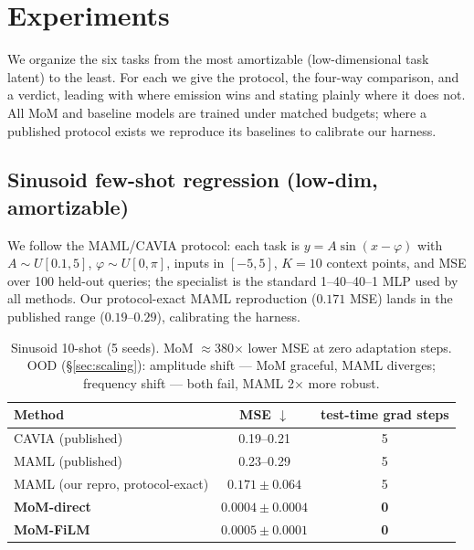 \documentclass[11pt]{article}
\begin{document}
\section{Experiments}\label{sec:exp}

We organize the six tasks from the most amortizable (low-dimensional task latent) to
the least. For each we give the protocol, the four-way comparison, and a verdict,
leading with where emission wins and stating plainly where it does not. All MoM and
baseline models are trained under matched budgets; where a published protocol exists
we reproduce its baselines to calibrate our harness.

\subsection{Sinusoid few-shot regression (low-dim, amortizable)}
We follow the MAML/CAVIA protocol: each task is $y=A\sin(x-\varphi)$ with
$A\sim U[0.1,5]$, $\varphi\sim U[0,\pi]$, inputs in $[-5,5]$, $K{=}10$ context points,
and MSE over 100 held-out queries; the specialist is the standard 1--40--40--1 MLP
used by all methods. Our protocol-exact MAML reproduction ($0.171$ MSE) lands in the
published range ($0.19$--$0.29$), calibrating the harness.
\begin{table}[h]\centering\small
\begin{tabular}{lcc}
\toprule
Method & MSE $\downarrow$ & test-time grad steps \\
\midrule
CAVIA (published) & 0.19--0.21 & 5 \\
MAML (published) & 0.23--0.29 & 5 \\
MAML (our repro, protocol-exact) & $0.171\pm0.064$ & 5 \\
\textbf{MoM-direct} & $\mathbf{0.0004\pm0.0004}$ & \textbf{0} \\
\textbf{MoM-FiLM} & $\mathbf{0.0005\pm0.0001}$ & \textbf{0} \\
\bottomrule
\end{tabular}
\caption{Sinusoid 10-shot (5 seeds). MoM $\approx$380$\times$ lower MSE at zero
adaptation steps. OOD (\S\ref{sec:scaling}): amplitude shift --- MoM graceful, MAML
diverges; frequency shift --- both fail, MAML 2$\times$ more robust.}
\end{table}
\end{document}
